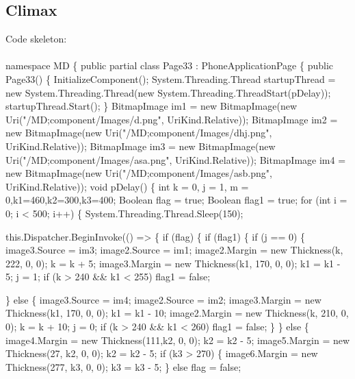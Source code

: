 {{\subsection{Climax}
\ttfamily \hspace{1cm}
Code skeleton:\\
\\

namespace MD
\{
    public partial class Page33 : PhoneApplicationPage
    \{
        public Page33()
        \{
            InitializeComponent();
            System.Threading.Thread startupThread =
                          new System.Threading.Thread(new System.Threading.ThreadStart(pDelay));
            startupThread.Start();
        \}
        BitmapImage im1 = new BitmapImage(new Uri("/MD;component/Images/d.png", UriKind.Relative));
        BitmapImage im2 = new BitmapImage(new Uri("/MD;component/Images/dhj.png", UriKind.Relative));
        BitmapImage im3 = new BitmapImage(new Uri("/MD;component/Images/asa.png", UriKind.Relative));
        BitmapImage im4 = new BitmapImage(new Uri("/MD;component/Images/asb.png", UriKind.Relative));
        void pDelay()
        \{
            int k = 0, j = 1, m = 0,k1=460,k2=300,k3=400;
            Boolean flag = true;
            Boolean flag1 = true;
            for (int i = 0; i < 500; i++)
            \{
                System.Threading.Thread.Sleep(150);

                this.Dispatcher.BeginInvoke(() =>
                \{
                    if (flag)
                    \{
                        if (flag1)
                        \{
                            if (j == 0)
                            \{
                                image3.Source = im3;
                                image2.Source = im1;
                                image2.Margin = new Thickness(k, 222, 0, 0); k = k + 5;
                                image3.Margin = new Thickness(k1, 170, 0, 0); k1 = k1 - 5;
                                j = 1;
                                if (k > 240 && k1 < 255)
                                    flag1 = false;

                            \}
                            else
                            \{
                                image3.Source = im4;
                                image2.Source = im2;
                                image3.Margin = new Thickness(k1, 170, 0, 0); k1 = k1 - 10;
                                image2.Margin = new Thickness(k, 210, 0, 0); k = k + 10;
                                j = 0;
                                if (k > 240 && k1 < 260)
                                    flag1 = false;
                            \}
                        \}
                        else
                        \{
                            image4.Margin = new Thickness(111,k2, 0, 0); k2 = k2 - 5;
                            image5.Margin = new Thickness(27, k2, 0, 0); k2 = k2 - 5;
                            if (k3 > 270)
                            \{
                                image6.Margin = new Thickness(277, k3, 0, 0); k3 = k3 - 5;
                            \}
                            else
                                flag = false;

}}
